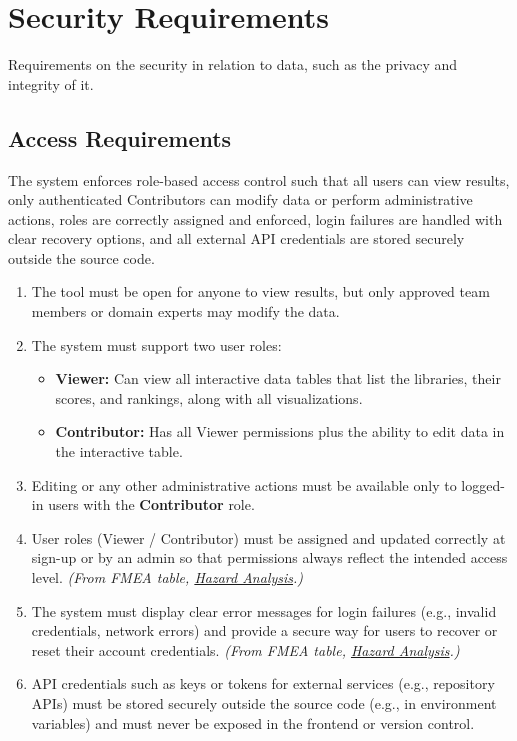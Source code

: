 \documentclass[12pt]{article}
\begin{document}
\section{Security Requirements}
Requirements on the security in relation to data, such as the privacy and integrity of it.
\subsection{Access Requirements}
The system enforces role-based access control such that all users can view results, only authenticated Contributors can modify data or perform administrative actions, roles are correctly assigned and enforced, login failures are handled with clear recovery options, and all external API credentials are stored securely outside the source code.

\begin{enumerate}[label=SR-AC\arabic*]

  \item The tool must be open for anyone to view results, but only approved team members or domain experts may modify the data.

  \item The system must support two user roles:
    \begin{itemize}
        \item \textbf{Viewer:} Can view all interactive data tables that list the libraries, their scores, and rankings, along with all visualizations.
        \item \textbf{Contributor:} Has all Viewer permissions plus the ability to edit data in the interactive table.
    \end{itemize}

  \item Editing or any other administrative actions must be available only to logged-in users with the \textbf{Contributor} role.

  \item User roles (Viewer / Contributor) must be assigned and updated correctly at sign-up or by an admin so that permissions always reflect the intended access level. \textit{(From FMEA table, \href{https://github.com/thaafei/DomainX/blob/main/docs/HazardAnalysis/HazardAnalysis.pdf}{Hazard Analysis}.)}

  \item The system must display clear error messages for login failures (e.g., invalid credentials, network errors) and provide a secure way for users to recover or reset their account credentials. \textit{(From FMEA table, \href{https://github.com/thaafei/DomainX/blob/main/docs/HazardAnalysis/HazardAnalysis.pdf}{Hazard Analysis}.)}

  \item API credentials such as keys or tokens for external services (e.g., repository APIs) must be stored securely outside the source code (e.g., in environment variables) and must never be exposed in the frontend or version control.

\end{enumerate}
\end{document}

